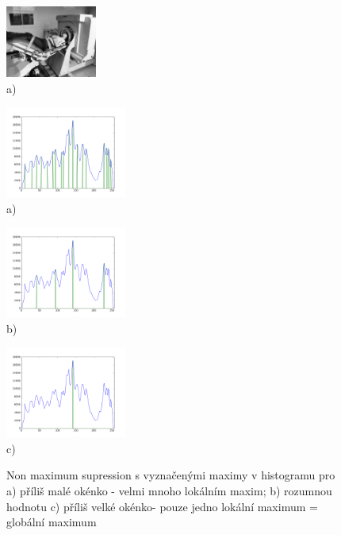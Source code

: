 \documentclass{thesis}%
\begin{document}
 \begin{figure}[htp!]
  \centering   
  \begin{minipage}[c]{\textwidth}
	\centering\includegraphics[width=3cm]{EMI_CT.png}\\
     a)
   \end{minipage}
  
   \begin{minipage}[c]{0.3\textwidth}
	\centering\includegraphics[width=4cm]{figNonMaxSup/tooShort.png}\\
     a)
   \end{minipage}
   \hspace*{0.1cm}
    \begin{minipage}[c]{0.3\textwidth}
    
	\centering\includegraphics[width=4cm]{figNonMaxSup/val50.png}\\
     b)
   \end{minipage}
   \hspace*{0.1cm}
    \begin{minipage}[c]{0.3\textwidth}
	\centering\includegraphics[width=4cm]{figNonMaxSup/tooLong.png}\\
     c)
   \end{minipage}

	\caption[Non maximum supression ukázka]{Non maximum supression s vyznačenými maximy v histogramu pro a) příliš malé okénko - velmi mnoho lokálním maxim; b) rozumnou hodnotu c) příliš velké okénko- pouze jedno lokální maximum = globální maximum}
\end{figure}
\end{document}

